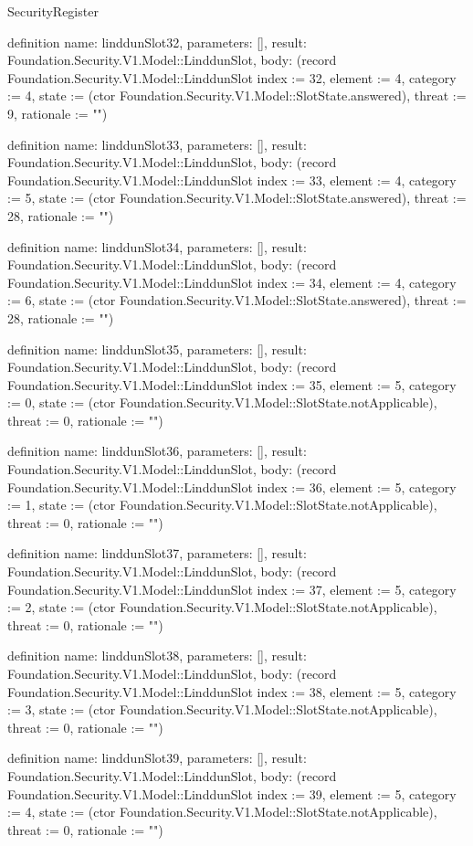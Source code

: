 \begin{lexlean}{SecurityRegister}
\begin{semanticmodule}
definition{
  name: linddunSlot32,
  parameters: [],
  result: Foundation.Security.V1.Model::LinddunSlot,
  body: (record Foundation.Security.V1.Model::LinddunSlot {index := 32, element := 4, category := 4, state := (ctor Foundation.Security.V1.Model::SlotState.answered), threat := 9, rationale := ""})
}

definition{
  name: linddunSlot33,
  parameters: [],
  result: Foundation.Security.V1.Model::LinddunSlot,
  body: (record Foundation.Security.V1.Model::LinddunSlot {index := 33, element := 4, category := 5, state := (ctor Foundation.Security.V1.Model::SlotState.answered), threat := 28, rationale := ""})
}

definition{
  name: linddunSlot34,
  parameters: [],
  result: Foundation.Security.V1.Model::LinddunSlot,
  body: (record Foundation.Security.V1.Model::LinddunSlot {index := 34, element := 4, category := 6, state := (ctor Foundation.Security.V1.Model::SlotState.answered), threat := 28, rationale := ""})
}

definition{
  name: linddunSlot35,
  parameters: [],
  result: Foundation.Security.V1.Model::LinddunSlot,
  body: (record Foundation.Security.V1.Model::LinddunSlot {index := 35, element := 5, category := 0, state := (ctor Foundation.Security.V1.Model::SlotState.notApplicable), threat := 0, rationale := ""})
}

definition{
  name: linddunSlot36,
  parameters: [],
  result: Foundation.Security.V1.Model::LinddunSlot,
  body: (record Foundation.Security.V1.Model::LinddunSlot {index := 36, element := 5, category := 1, state := (ctor Foundation.Security.V1.Model::SlotState.notApplicable), threat := 0, rationale := ""})
}

definition{
  name: linddunSlot37,
  parameters: [],
  result: Foundation.Security.V1.Model::LinddunSlot,
  body: (record Foundation.Security.V1.Model::LinddunSlot {index := 37, element := 5, category := 2, state := (ctor Foundation.Security.V1.Model::SlotState.notApplicable), threat := 0, rationale := ""})
}

definition{
  name: linddunSlot38,
  parameters: [],
  result: Foundation.Security.V1.Model::LinddunSlot,
  body: (record Foundation.Security.V1.Model::LinddunSlot {index := 38, element := 5, category := 3, state := (ctor Foundation.Security.V1.Model::SlotState.notApplicable), threat := 0, rationale := ""})
}

definition{
  name: linddunSlot39,
  parameters: [],
  result: Foundation.Security.V1.Model::LinddunSlot,
  body: (record Foundation.Security.V1.Model::LinddunSlot {index := 39, element := 5, category := 4, state := (ctor Foundation.Security.V1.Model::SlotState.notApplicable), threat := 0, rationale := ""})
}


\end{semanticmodule}
\end{lexlean}
